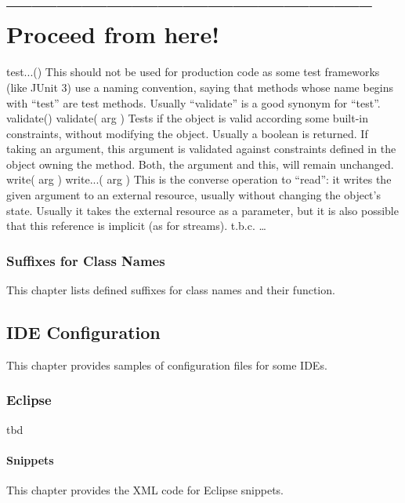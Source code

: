 \documentclass[12pt,a4paper,titlepage, parskip=half, headsepline, footsepline, cleardoubleplain]{scrbook}
\begin{document}
\chapter{-------------------------------------------- Proceed from here!}







test...()
This should not be used for production code as some test frameworks (like JUnit 3) use a naming convention, saying that methods whose name begins with “test” are test methods.
Usually “validate” is a good synonym for “test”.
validate()
validate( arg )
Tests if the object is valid according some built-in constraints, without modifying the object. Usually a boolean is returned.
If taking an argument, this argument is validated against constraints defined in the object owning the method. Both, the argument and this, will remain unchanged.
write( arg )
write...( arg )
This is the converse operation to “read”: it writes the given argument to an external resource, usually without changing the object’s state.
Usually it takes the external resource as a parameter, but it is also possible that this reference is implicit (as for streams).
t.b.c.
…


\subsection{Suffixes for Class Names}
This chapter lists defined suffixes for class names and their function.

\renewcommand{\cellalign}{tl}

\section{IDE Configuration}\label{sec:IDEConfiguration}
This chapter provides samples of configuration files for some IDEs.

\subsection{Eclipse}\label{sec:EclipseConfiguration}
tbd
\subsubsection{Snippets}
This chapter provides the XML code for Eclipse snippets.
\end{document}
